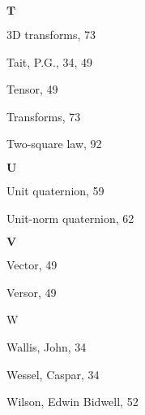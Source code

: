   $\mathbf{T}$
  
  3D transforms, 73
  
  Tait, P.G., 34, 49
  
  Tensor, 49
  
  Transforms, 73
  
  Two-square law, 92
  
  $\mathbf{U}$
  
  Unit quaternion, 59
  
  Unit-norm quaternion, 62
  
  $\mathbf{V}$
  
  Vector, 49
  
  Versor, 49
  
  W
  
  Wallis, John, 34
  
  Wessel, Caspar, 34
  
  Wilson, Edwin Bidwell, 52
  
  